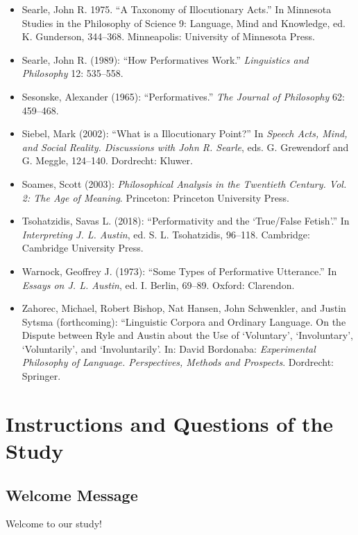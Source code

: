 \documentclass[egregdoesnotlikesansseriftitles,12pt]{scrartcl}
\begin{document}
\begin{itemize}[label=,leftmargin=\parindent,itemindent=-\parindent]
   \item Searle, John R. 1975. ``A Taxonomy of Illocutionary Acts.'' In Minnesota Studies in the Philosophy of Science 9: Language, Mind and Knowledge, ed. K. Gunderson, 344--368. Minneapolis: University of Minnesota Press.
   \item Searle, John R. (1989): ``How Performatives Work.'' \textit{Linguistics and Philosophy} 12: 535--558.
   \item Sesonske, Alexander (1965): ``Performatives.'' \textit{The Journal of Philosophy} 62: 459--468.
   \item Siebel, Mark (2002): ``What is a Illocutionary Point?'' In \textit{Speech Acts, Mind, and Social Reality. Discussions with John R. Searle}, eds. G. Grewendorf and G. Meggle, 124--140. Dordrecht: Kluwer.
   \item Soames, Scott (2003): \textit{Philosophical Analysis in the Twentieth Century. Vol. 2: The Age of Meaning}. Princeton: Princeton University Press.
   \item Tsohatzidis, Savas L. (2018): ``Performativity and the `True/False Fetish'.'' In \textit{Interpreting J. L. Austin}, ed. S. L. Tsohatzidis, 96--118. Cambridge: Cambridge University Press.
   \item Warnock, Geoffrey J. (1973): ``Some Types of Performative Utterance.'' In \textit{Essays on J. L. Austin}, ed. I. Berlin, 69--89. Oxford: Clarendon.
   \item Zahorec, Michael, Robert Bishop, Nat Hansen, John Schwenkler, and Justin Sytsma (forthcoming): ``Linguistic Corpora and Ordinary Language. On the Dispute between Ryle and Austin about the Use of `Voluntary', `Involuntary', `Voluntarily', and `Involuntarily'. In: David Bordonaba: \textit{Experimental Philosophy of Language. Perspectives, Methods and Prospects}. Dordrecht: Springer.
\end{itemize}


\clearpage
\appendix
\section{Instructions and Questions of the Study}\label{sec:app_instructions}


\subsection{Welcome Message}\label{sec:app_welcome}
Welcome to our study!
\end{document}
